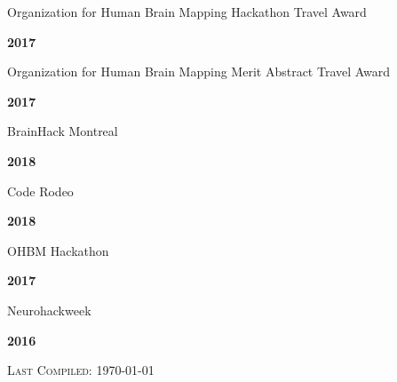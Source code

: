\documentclass[10pt]{article}
\newenvironment{bottompar}{\par\vspace*{\fill}}{\clearpage}
\newcommand{\headstyle}{\scshape \normalsize \textcolor{light-gray}}
\newcommand{\sectionstyle}{\LARGE \fontfamily{lmr}\selectfont}
\begin{document}
\bigskip

\begin{center}\sectionstyle{HONORS AND AWARDS}\end{center}

\begin{minipage}[t]{.85\linewidth}
\flushleft
\noindent
Organization for Human Brain Mapping Hackathon Travel Award
\end{minipage}
\hfill
\begin{minipage}[t]{.15\linewidth}
\flushright
\noindent
\textsc{\textbf{2017}}
\end{minipage}

\begin{minipage}[t]{.85\linewidth}
\flushleft
\noindent
Organization for Human Brain Mapping Merit Abstract Travel Award
\end{minipage}
\hfill
\begin{minipage}[t]{.15\linewidth}
\flushright
\noindent
\textsc{\textbf{2017}}
\end{minipage}

\bigskip

\begin{center}\sectionstyle{HACKATHONS}\end{center}

\begin{minipage}[t]{.85\linewidth}
\flushleft
\noindent
BrainHack Montreal
\end{minipage}
\hfill
\begin{minipage}[t]{.15\linewidth}
\flushright
\noindent
\textsc{\textbf{2018}}
\end{minipage}

\begin{minipage}[t]{.85\linewidth}
\flushleft
\noindent
Code Rodeo
\end{minipage}
\hfill
\begin{minipage}[t]{.15\linewidth}
\flushright
\noindent
\textsc{\textbf{2018}}
\end{minipage}

\begin{minipage}[t]{.85\linewidth}
\flushleft
\noindent
OHBM Hackathon
\end{minipage}
\hfill
\begin{minipage}[t]{.15\linewidth}
\flushright
\noindent
\textsc{\textbf{2017}}
\end{minipage}

\begin{minipage}[t]{.85\linewidth}
\flushleft
\noindent
Neurohackweek
\end{minipage}
\hfill
\begin{minipage}[t]{.15\linewidth}
\flushright
\noindent
\textsc{\textbf{2016}}
\end{minipage}

\begin{bottompar}
	\begin{center}
		\headstyle{Last Compiled: \today}
	\end{center}
\end{bottompar}
\end{document}

